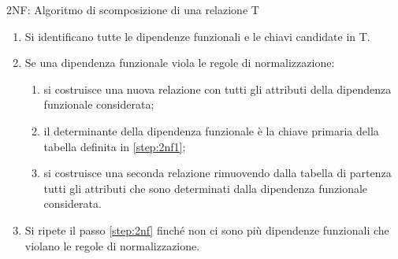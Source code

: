 \begin{frame}{2NF: Algoritmo di scomposizione di una relazione T}
\begin{minipage}{0.8\textwidth}
\begin{enumerate}
    \item Si identificano tutte le dipendenze funzionali e le chiavi candidate in T.
    \item Se una dipendenza funzionale viola le regole di normalizzazione:\label{step:2nf}
    \begin{minipage}{0.8\textwidth}
    \begin{enumerate}[a]
        \item si costruisce una nuova relazione con tutti gli attributi della dipendenza funzionale considerata;\label{step:2nf1}
        \item il determinante della dipendenza funzionale \`e la chiave primaria della tabella definita in \ref{step:2nf1};
        \item si costruisce una seconda relazione rimuovendo dalla tabella di partenza tutti gli attributi che sono determinati dalla dipendenza funzionale considerata.
    \end{enumerate}
    \end{minipage}
    \item Si ripete il passo \ref{step:2nf} finch\'e non ci sono pi\`u dipendenze funzionali che violano le regole di normalizzazione.
\end{enumerate}
\end{minipage}
\end{frame}
%
